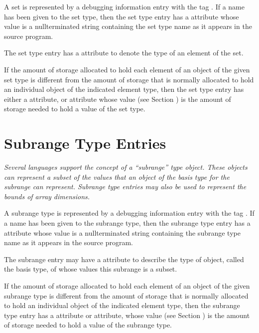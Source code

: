 A set is represented by a debugging information entry with
the tag . 
If a name has been given to the
set type, then the set type entry has a  attribute
whose value is a null\dash terminated string containing the
set type name as it appears in the source program.

The set type entry has a  attribute to denote the
type of an element of the set.

If the amount of storage allocated to hold each element of an
object of the given set type is different from the amount of
storage that is normally allocated to hold an individual object
of the indicated element type, then the set type entry has
either a  attribute, or  attribute
whose value (see Section ) is
the amount of storage needed to hold a value of the set type.


\section{Subrange Type Entries}
\label{chap:subrangetypeentries}

\textit{Several languages support the concept of a ``subrange''
type object. These objects can represent a subset of the
values that an object of the basis type for the subrange can
represent. Subrange type entries may also be used to represent
the bounds of array dimensions.}

A subrange type is represented by a debugging information
entry with the 
tag . 
If a name has been
given to the subrange type, then the subrange type entry
has a  attribute whose value is a null\dash terminated
string containing the subrange type name as it appears in
the source program.

The subrange entry may have a  attribute to describe
the type of object, called the basis type, of whose values
this subrange is a subset.

If the amount of storage allocated to hold each element of an
object of the given subrange type is different from the amount
of storage that is normally allocated to hold an individual
object of the indicated element type, then the subrange
type entry has a  attribute or 
attribute, whose value 
(see Section )
is the amount of
storage needed to hold a value of the subrange type.

